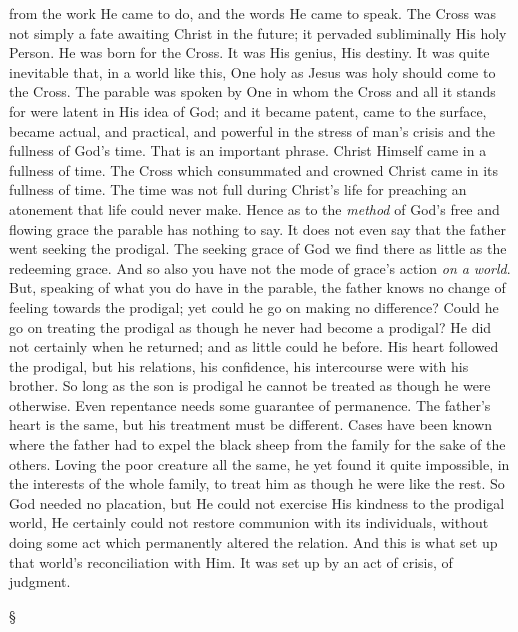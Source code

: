 \documentclass[12pt,letterpaper,oneside]{book}
\begin{document}
from the work He came to do, and the words He 
came to speak. The Cross was not simply a 
fate awaiting Christ in the future; it pervaded 
subliminally His holy Person. He was born for 
the Cross. It was His genius, His destiny. It 
was quite inevitable that, in a world like this, 
One holy as Jesus was holy should come to the 
Cross. The parable was spoken by One in 
whom the Cross and all it stands for were 
latent in His idea of God; and it became 
patent, came to the surface, became actual, 
and practical, and powerful in the stress of 
man's crisis and the fullness of God's time. 
That is an important phrase. Christ Himself 
came in a fullness of time. The Cross which 
consummated and crowned Christ came in its 
fullness of time. The time was not full during 
Christ's life for preaching an atonement that life 
could never make. Hence as to the \textit{method} of 
God's free and flowing grace the parable has 
nothing to say. It does not even say that 
the father went seeking the prodigal. The 
seeking grace of God we find there as little 
as the redeeming grace. And so also you 
have not the mode of grace's action \textit{on a} 
\textit{world}. But, speaking of what you do have in 
the parable, the father knows no change of 
feeling towards the prodigal; yet could he go 
on making no difference? Could he go on 
treating the prodigal as though he never had 
become a prodigal? He did not certainly when 
he returned; and as little could he before. 
His heart followed the prodigal, but his relations, 
his confidence, his intercourse were 
with his brother. So long as the son is prodigal 
he cannot be treated as though he were 
otherwise. Even repentance needs some guarantee 
of permanence. The father's heart is 
the same, but his treatment must be different. 
Cases have been known where the father had 
to expel the black sheep from the family for 
the sake of the others. Loving the poor 
creature all the same, he yet found it quite 
impossible, in the interests of the whole family, 
to treat him as though he were like the rest. 
So God needed no placation, but He could not 
exercise His kindness to the prodigal world, He 
certainly could not restore communion with its 
individuals, without doing some act which permanently 
altered the relation. And this is what 
set up that world's reconciliation with Him. It 
was set up by an act of crisis, of judgment. 

\begin{center}
\S
\end{center}
\end{document}
